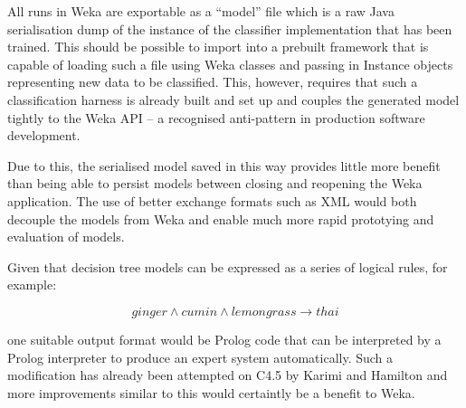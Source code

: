\documentclass[11pt,a4paper]{article}
\begin{document}
All runs in Weka are exportable as a ``model'' file which is a raw Java
serialisation dump of the instance of the classifier implementation that
has been trained. This should be possible to import into a prebuilt
framework that is capable of loading such a file using Weka
classes and passing in Instance objects representing new data to be
classified. This, however, requires that such a classification harness
is already built and set up and couples the generated model tightly to
the Weka API -- a recognised anti-pattern in production software development.

Due to this, the serialised model saved in this way provides little more
benefit than being able to persist models between closing and reopening
the Weka application. The use of better exchange formats such as XML
would both decouple the models from Weka and enable much more rapid prototying
and evaluation of models.

Given that decision tree models can be expressed as a series of logical rules, for
example:

\begin{equation}
  ginger \land cumin \land lemongrass \to thai
\end{equation}

\noindent one suitable output format would be Prolog code that can be interpreted
by a Prolog interpreter to produce an expert system automatically. Such a modification
has already been attempted on C4.5 by Karimi and Hamilton \cite{karimi2000logical}
and more improvements similar to this would certaintly be a benefit to Weka.



\end{document}
